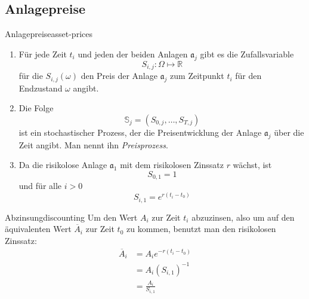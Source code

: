 \documentclass[11pt]{report} %
\begin{document}
\subsection{Anlagepreise}
\begin{Definition}{Anlagepreise}{asset-prices}
    \begin{enumerate}
        \item Für jede Zeit $t_i$ und jeden der beiden Anlagen $\mathfrak{a}_j$ gibt es die Zufallsvariable $$S_{i, j}:\Omega \mapsto \mathbb{R}$$ für die $S_{i, j}(\omega)$ den Preis der Anlage $\mathfrak{a}_j$ zum Zeitpunkt $t_i$ für den Endzustand $\omega$ angibt.
        \item Die Folge $$\mathbb{S}_j=(S_{0, j}, \ldots, S_{T, j})$$ ist ein stochastischer Prozess, der die Preisentwicklung der Anlage $\mathfrak{a}_j$ über die Zeit angibt. Man nennt ihn \textit{Preisprozess}.
        \item Da die risikolose Anlage $\mathfrak{a}_1$ mit dem risikolosen Zinssatz $r$ wächst, ist $$S_{0, 1}=1$$ und für alle $i>0$ $$S_{i, 1}=e^{r(t_i-t_0)}$$
    \end{enumerate}
\end{Definition}
\begin{Definition}{Abzinsung}{discounting}
    Um den Wert $A_i$ zur Zeit $t_i$ abzuzinsen, also um auf den äquivalenten Wert $\overline{A}_i$ zur Zeit $t_0$ zu kommen, benutzt man den risikolosen Zinssatz:
    \begin{align*}
        \overline{A}_i&=A_ie^{-r(t_i-t_0)}\\
        &= A_i(S_{i, 1})^{-1}\\
        &= \frac{A_i}{S_{i, 1}}
    \end{align*}
\end{Definition}
\end{document}
